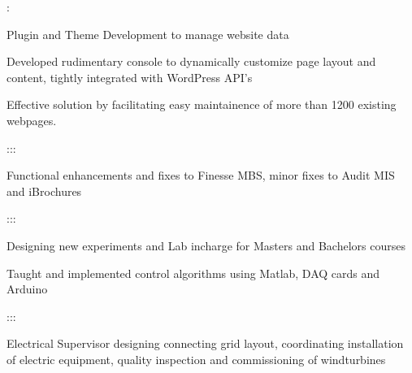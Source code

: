 \documentclass[]{hemant-style}
\begin{document}
\begin{minipage}[]{\textwidth}
\begin{minipage}{\textwidth}
\begin{minipage}[t][][c]{.75\textwidth}
\begin{hitemize}
                            \end{hitemize}
                            :
                            \begin{hitemize}
                                \item Plugin and Theme Development to manage website data
                                \item Developed rudimentary console to dynamically customize page layout and content, tightly integrated with WordPress API's
                                \item Effective solution by facilitating easy maintainence of more than 1200 existing webpages.
                            \end{hitemize}
                            :::
                            \begin{hitemize}
                                \item Functional enhancements and fixes to Finesse MBS, minor fixes to Audit MIS and iBrochures
                            \end{hitemize}
                            :::
                            \begin{hitemize}
                                \item Designing new experiments and Lab incharge for Masters and Bachelors courses
                                \item Taught and implemented control algorithms using Matlab, DAQ cards and Arduino
                            \end{hitemize}
                            :::
                            \begin{hitemize}
                                \item Electrical Supervisor designing connecting grid layout, coordinating installation of electric
                                equipment, quality inspection and commissioning of windturbines
                            \end{hitemize}
                            \vspace{1em}

\end{minipage}
\end{minipage}
\end{minipage}
\end{document}
